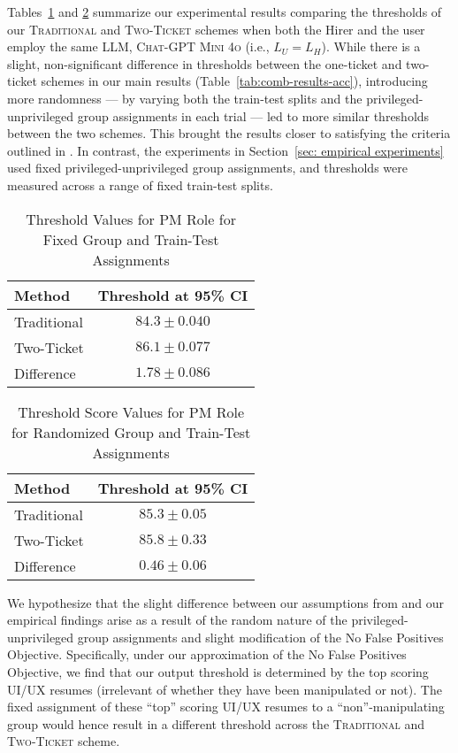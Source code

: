Tables~\ref{tab: Threshold Values 1} and \ref{tab: Threshold Values 2} summarize our experimental results comparing the thresholds of our \textsc{Traditional} and \textsc{Two-Ticket} schemes when both the Hirer and the user employ the same LLM, \textsc{Chat-GPT Mini 4o} (i.e., $L_U = L_H$). While there is a slight, non-significant difference in thresholds between the one-ticket and two-ticket schemes in our main results (Table~\ref{tab:comb-results-acc}), introducing more randomness --- by varying both the train-test splits and the privileged-unprivileged group assignments in each trial --- led to more similar thresholds between the two schemes. This brought the results closer to satisfying the criteria outlined in . In contrast, the experiments in Section~\ref{sec: empirical experiments} used fixed privileged-unprivileged group assignments, and thresholds were measured across a range of fixed train-test splits.

\begin{table}[h!]
\centering
\begin{tabular}{|l|c|}
\hline
\textbf{Method} & \textbf{Threshold at 95\% CI} \\
\hline
Traditional     & $84.3 \pm 0.040$ \\
Two-Ticket      & $86.1 \pm 0.077$ \\
Difference      & $1.78 \pm 0.086$ \\
\hline
\end{tabular}
\caption{Threshold Values for PM Role for Fixed Group and Train-Test Assignments}
\label{tab: Threshold Values 1}
\end{table}

\begin{table}[h!]
\centering
\begin{tabular}{|l|c|}
\hline
\textbf{Method} & \textbf{Threshold at 95\% CI} \\
\hline
Traditional     & $85.3 \pm 0.05$ \\
Two-Ticket      & $85.8 \pm 0.33$ \\
Difference      & $0.46 \pm 0.06$ \\
\hline
\end{tabular}
\caption{Threshold Score Values for PM Role for Randomized Group and Train-Test Assignments}
\label{tab: Threshold Values 2}
\end{table}

We hypothesize that the slight difference between our assumptions from  and our empirical findings arise as a result of the random nature of the privileged-unprivileged group assignments and slight modification of the No False Positives Objective. Specifically, under our approximation of the No False Positives Objective, we find that our output threshold is determined by the top scoring UI/UX resumes (irrelevant of whether they have been manipulated or not). The fixed assignment of these “top” scoring UI/UX resumes to a ``non''-manipulating group would hence result in a different threshold across the \textsc{Traditional} and \textsc{Two-Ticket} scheme. 

